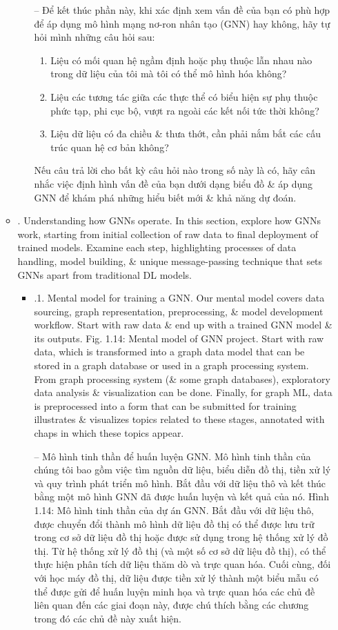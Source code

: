 \documentclass{article}
\begin{document}
\begin{itemize}
\begin{itemize}
\begin{itemize}
            -- Để kết thúc phần này, khi xác định xem vấn đề của bạn có phù hợp để áp dụng mô hình mạng nơ-ron nhân tạo (GNN) hay không, hãy tự hỏi mình những câu hỏi sau:
            \begin{enumerate}
                \item Liệu có mối quan hệ ngầm định hoặc phụ thuộc lẫn nhau nào trong dữ liệu của tôi mà tôi có thể mô hình hóa không?
                \item Liệu các tương tác giữa các thực thể có biểu hiện sự phụ thuộc phức tạp, phi cục bộ, vượt ra ngoài các kết nối tức thời không?
                \item Liệu dữ liệu có đa chiều \& thưa thớt, cần phải nắm bắt các cấu trúc quan hệ cơ bản không?
            \end{enumerate}
            Nếu câu trả lời cho bất kỳ câu hỏi nào trong số này là có, hãy cân nhắc việc định hình vấn đề của bạn dưới dạng biểu đồ \& áp dụng GNN để khám phá những hiểu biết mới \& khả năng dự đoán.
        \end{itemize}
        \item {. Understanding how GNNs operate.} In this section, explore how GNNs work, starting from initial collection of raw data to final deployment of trained models. Examine each step, highlighting processes of data handling, model building, \& unique message-passing technique that sets GNNs apart from traditional DL models.
        \begin{itemize}
            \item {.1. Mental model for training a GNN.} Our mental model covers data sourcing, graph representation, preprocessing, \& model development workflow. Start with raw data \& end up with a trained GNN model \& its outputs. {\sf Fig. 1.14: Mental model of GNN project. Start with raw data, which is transformed into a graph data model that can be stored in a graph database or used in a graph processing system. From graph processing system (\& some graph databases), exploratory data analysis \& visualization can be done. Finally, for graph ML, data is preprocessed into a form that can be submitted for training} illustrates \& visualizes topics related to these stages, annotated with chaps in which these topics appear.

            -- {\sf Mô hình tinh thần để huấn luyện GNN.} Mô hình tinh thần của chúng tôi bao gồm việc tìm nguồn dữ liệu, biểu diễn đồ thị, tiền xử lý và quy trình phát triển mô hình. Bắt đầu với dữ liệu thô và kết thúc bằng một mô hình GNN đã được huấn luyện và kết quả của nó. {\sf Hình 1.14: Mô hình tinh thần của dự án GNN. Bắt đầu với dữ liệu thô, được chuyển đổi thành mô hình dữ liệu đồ thị có thể được lưu trữ trong cơ sở dữ liệu đồ thị hoặc được sử dụng trong hệ thống xử lý đồ thị. Từ hệ thống xử lý đồ thị (và một số cơ sở dữ liệu đồ thị), có thể thực hiện phân tích dữ liệu thăm dò và trực quan hóa. Cuối cùng, đối với học máy đồ thị, dữ liệu được tiền xử lý thành một biểu mẫu có thể được gửi để huấn luyện} minh họa và trực quan hóa các chủ đề liên quan đến các giai đoạn này, được chú thích bằng các chương trong đó các chủ đề này xuất hiện.


\end{itemize}
\end{itemize}
\end{itemize}
\end{document}
